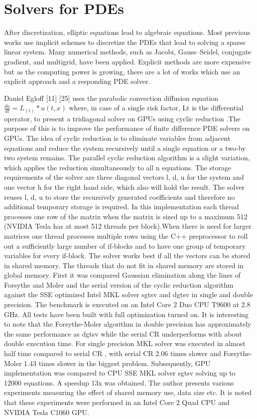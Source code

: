 \section{Solvers for PDEs}
After discretization, elliptic equations lead to algebraic equations. Most previous works use implicit schemes to discretize the PDEs that lead to solving a sparse linear system. Many numerical methods, such as Jacobi, Gauss–Seidel, conjugate gradient, and multigrid, have been applied. Explicit methods are more expensive but as the computing power is growing, there are a lot of works which use an explicit approach and a responding PDE solver.

Daniel Egloff  [11] [25] uses the parabolic convection diffusion equation $\frac{du}{dt} = L_(t )*u(t,x)$   where, in case of a single risk factor, Lt is the differential operator, to present a tridiagonal solver on GPUs using cyclic reduction .The purpose of this is to improve  the performance of  finite difference PDE solvers on GPUs. The idea of cyclic reduction is to eliminate variables from adjacent equations and reduce the system recursively until a single equation or a two-by two system remains. The parallel cyclic reduction algorithm is a slight variation, which applies the reduction simultaneously to all n equations. The storage requirements of the solver are three diagonal vectors l, d, u for the system and one vector h for the right hand side, which also will hold the result. The solver reuses l, d, u to store the recursively generated coefficients and therefore no additional temporary storage is required. In this implementation each thread processes one row of the matrix when the matrix is sized up to a maximum 512 (NVIDIA Tesla has at most 512 threads per block).When there is need for larger matrices one thread processes multiple rows using the C++ preprocessor to roll out a sufficiently large number of if-blocks and to have one group of temporary variables for every if-block. The solver works best if all the vectors can be stored in shared memory. The threads that do not fit in shared memory are stored in global memory.  First it was compared Gaussian elimination along the lines of Forsythe and Moler and the serial version of the cyclic reduction algorithm against the SSE optimized Intel MKL solver sgtsv and dgtsv in single and double precision. The benchmark is executed on an Intel Core 2 Duo CPU T9600 at 2.8 GHz. All tests have been built with full optimization turned on. It is interesting to note that the Forsythe-Moler algorithm in double precision has approximately the same performance as dgtsv while the serial CR underperforms with about double execution time. For single precision MKL solver was executed in almost half time compared to serial CR , with serial CR 2.06 times slower and Forsythe-Moler 1.43 times slower in the biggest problem. Subsequently, GPU implementation was compared to CPU SSE MKL solver sgtsv solving up to 12000 equations. A speedup 13x was obtained. The author presents various experiments measuring the effect of shared memory use, data size etc. It is noted that these experiments were performed in an Intel Core 2 Quad CPU and NVIDIA Tesla C1060 GPU.


